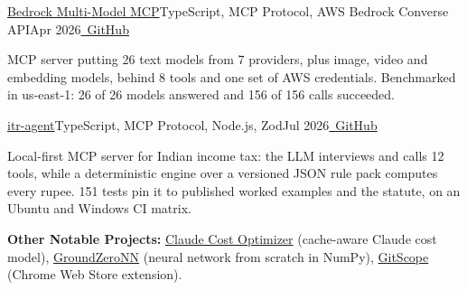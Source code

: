 \resumeExp
{\href{https://github.com/Sagargupta16/bedrock-multi-model-mcp}{Bedrock Multi-Model MCP}}{TypeScript, MCP Protocol, AWS Bedrock Converse API}{Apr 2026}{\href{https://github.com/Sagargupta16/bedrock-multi-model-mcp}{\faGithub\ GitHub}}
\resumeItemListStart
    \item[$\diamond$] MCP server putting 26 text models from 7 providers, plus image, video and embedding models, behind 8 tools and one set of AWS credentials. Benchmarked in us-east-1: 26 of 26 models answered and 156 of 156 calls succeeded.
\resumeItemListEnd

\resumeExp
{\href{https://github.com/Sagargupta16/itr-agent}{itr-agent}}{TypeScript, MCP Protocol, Node.js, Zod}{Jul 2026}{\href{https://github.com/Sagargupta16/itr-agent}{\faGithub\ GitHub}}
\resumeItemListStart
    \item[$\diamond$] Local-first MCP server for Indian income tax: the LLM interviews and calls 12 tools, while a deterministic engine over a versioned JSON rule pack computes every rupee. 151 tests pin it to published worked examples and the statute, on an Ubuntu and Windows CI matrix.
\resumeItemListEnd

\resumeSubHeadingListEnd
\vspace{-2pt}
\small{\textbf{Other Notable Projects:} \href{https://github.com/Sagargupta16/claude-cost-optimizer}{Claude Cost Optimizer} (cache-aware Claude cost model), \href{https://github.com/Sagargupta16/GroundZeroNN}{GroundZeroNN} (neural network from scratch in NumPy), \href{https://chromewebstore.google.com/detail/gitscope/fndaanihifimmlnmkjdmjbbkbdajolff}{GitScope} (Chrome Web Store extension).}
\vspace{-2mm}
